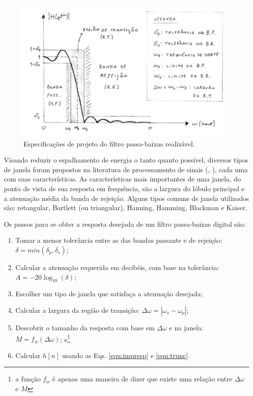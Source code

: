 \begin{figure}[ht!]
    \centering
    \includegraphics[width=350pt]{figures/chap3-design-lowpass.pdf}
    \caption[Especificações de projeto do filtro passa-baixas realizável]{Especificações de projeto do filtro passa-baixas realizável.}
    \label{fig:design}
\end{figure}

Visando reduzir o espalhamento de energia o tanto quanto possível, diversos tipos de janela foram propostos na literatura de processamento de sinais (\cite{Harris1978}, \cite{Kaiser1980}), cada uma com suas características. As características mais importantes de uma janela, do ponto de vista de sua resposta em frequência, são a largura do lóbulo principal e a atenuação média da banda de rejeição. Alguns tipos comuns de janela utilizados são: retangular, Bartlett (ou triangular), Hanning, Hamming, Blackman e Kaiser.

Os passos para se obter a resposta desejada de um filtro passa-baixas digital são:
\begin{enumerate}
    \item Tomar a menor tolerância entre as das bandas passante e de rejeição: $\delta = min(\delta_p,\delta_s)$;
    \item Calcular a atenuação requerida em decibéis, com base na tolerância: $A = -20\log_{10}(\delta)$;
    \item Escolher um tipo de janela que satisfaça a atenuação desejada; 
    \item Calcular a largura da região de transição: $\Delta\omega = |\omega_s-\omega_p|$;
    \item Descobrir o tamanho da resposta com base em $\Delta\omega$ e na janela: $M = f_w(\Delta\omega)$; e\footnote{a função $f_w$ é apenas uma maneira de dizer que existe uma relação entre $\Delta\omega$ e $M$}
    \item Calcular $h[n]$ usando as Eqs. \ref{equ:impresp} e \ref{equ:trunc}.
\end{enumerate}



